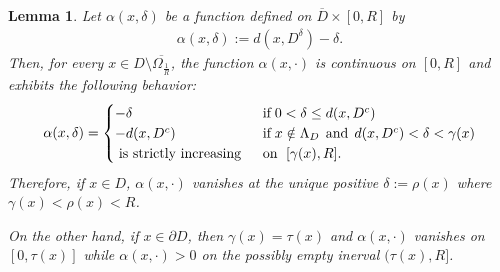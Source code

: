 \documentclass[reqno,11pt]{amsart}
\newtheorem{lemma}[theorem]{Lemma}
\theoremstyle{definition}
\numberwithin{equation}{section}
\def\ov{\overline}
\newcommand{\tinm}[1]{\text{\;#1\;}}
\newcommand{\1}{{{\bf 1}\kern-0,28em\rm l}}
\begin{document}
\begin{lemma}\label{alpha}
Let $\alpha(x,\delta)$ be a function defined on $\ov D\times [0,R]$ by
\begin{align}\label{def:alpha}
\alpha(x,\delta) := d(x,D^\delta) - \delta .
\end{align}
Then, for every  $x\in D\setminus\ov{\Omega_{\frac{1}{R}}}$, the function $\alpha(x,\cdot)$ is continuous on $[0,R]$ and exhibits the following behavior:
\begin{align*}
\alpha(x,\delta)= 
\begin{cases}
 -\delta \qquad &\tinm{if} 0 < \delta \le d(x,D^c) \\
 -d(x,D^c) & \tinm{if} x\notin \Lambda_D \, \tinm{and}\, d(x,D^c) < \delta < \gamma(x)\\
\tinm{is strictly increasing} &\tinm{on } [\gamma(x),R] .
\end{cases}
\end{align*}
Therefore, if $x\in D$, $\alpha(x,\cdot)$ vanishes at the unique positive  $\delta:=\rho(x)$ where $\gamma(x)< \rho(x)< R$.

\medskip
On the other hand, if $x\in \partial D$, then $\gamma(x)=\tau(x)$ and $\alpha(x,\cdot)$ vanishes on $[0,\tau(x)]$ while $\alpha(x,\cdot)>0$ on the possibly empty
inerval $(\tau(x), R]$.
\end{lemma}
\end{document}
